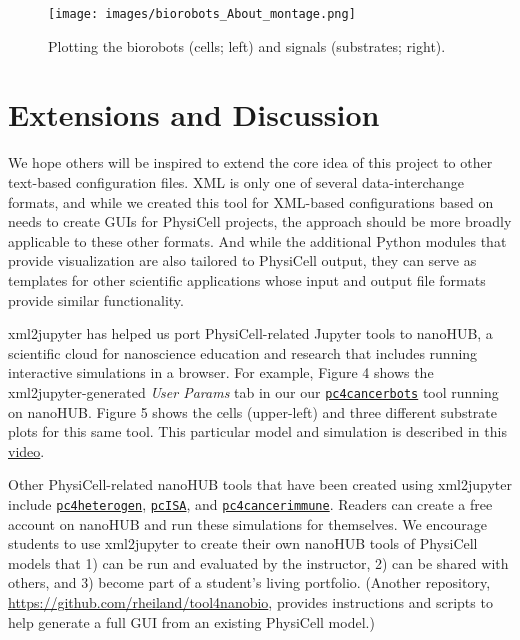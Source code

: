 \documentclass[10pt,letterpaper]{article}
\begin{document}
\begin{figure}
\centering
\texttt{[image: images/biorobots\_About\_montage.png]}
\caption{Plotting the biorobots (cells; left) and signals (substrates;
right).}
\end{figure}

\section*{Extensions and Discussion}

We hope others will be inspired to extend the core idea of this project
to other text-based configuration files. XML is only one of several
data-interchange formats, and while we
created this tool for XML-based configurations based on needs to create
GUIs for PhysiCell projects, the approach should be more broadly
applicable to these other formats. And while the additional Python
modules that provide visualization are also tailored to PhysiCell
output, they can serve as templates for other scientific applications
whose input and output file formats provide similar functionality.

xml2jupyter has helped us port PhysiCell-related Jupyter tools to
nanoHUB, a scientific cloud for nanoscience education and research that
includes running interactive simulations in a browser. For example,
Figure 4 shows the xml2jupyter-generated \emph{User Params} tab in our
our
\href{https://nanohub.org/tools/pc4cancerbots}{\texttt{pc4cancerbots}}
tool running on nanoHUB. Figure 5 shows the cells (upper-left) and three
different substrate plots for this same tool. This particular model and
simulation is described in this
\href{https://www.youtube.com/watch?v=wuDZ40jW__M}{video}.

Other PhysiCell-related nanoHUB tools that have been created using
xml2jupyter include
\href{https://nanohub.org/tools/pc4heterogen}{\texttt{pc4heterogen}},
\href{https://nanohub.org/tools/pcisa}{\texttt{pcISA}}, and
\href{https://nanohub.org/tools/pc4cancerimmune}{\texttt{pc4cancerimmune}}.
Readers can create a free account on nanoHUB and run these simulations
for themselves. We encourage students to use xml2jupyter to create their
own nanoHUB tools of PhysiCell models that 1) can be run and evaluated
by the instructor, 2) can be shared with others, and 3) become part of a
student's living portfolio. (Another repository,
\url{https://github.com/rheiland/tool4nanobio}, provides instructions
and scripts to help generate a full GUI from an existing PhysiCell
model.)
\end{document}
